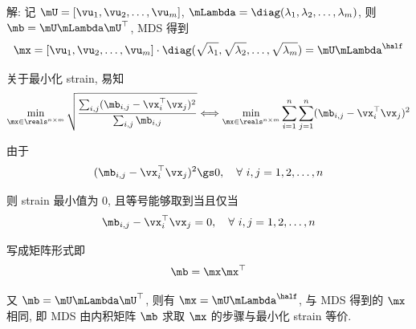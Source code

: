 \documentclass[openany]{ctexbook}
\theoremstyle{kaiti}
\theoremstyle{normal}
\begin{document}
解: 记 $\mU=[\vu_1, \vu_2, \dots, \vu_m]$, $\mLambda=\diag(\lambda_1, \lambda_2, \dots, \lambda_m)$, 则 $\mb=\mU\mLambda\mU^\top$,  MDS 得到
\begin{equation}
  \mx
  =[\vu_1, \vu_2, \dots, \vu_m]\cdot\diag(\sqrt{\lambda_1}, \sqrt{\lambda_2}, \dots, \sqrt{\lambda_m})
  =\mU\mLambda^{\half}
\end{equation}

关于最小化 strain, 易知
\begin{equation}
  \min_{\mx\in\reals^{n\times m}}\sqrt{\frac{\sum_{i,j}(\mb_{i,j} - \vx_i^\top\vx_j)^2}{\sum_{i,j}\mb_{i,j}}}
  \Longleftrightarrow
  \min_{\mx\in\reals^{n\times m}}\sum_{i=1}^n\sum_{j=1}^n(\mb_{i,j} - \vx_i^\top\vx_j)^2
\end{equation}

由于
\begin{equation}
  (\mb_{i,j} - \vx_i^\top\vx_j)^2\gs0,\quad\forall~i,j=1,2,\dots,n
\end{equation}

则 strain 最小值为 0, 且等号能够取到当且仅当
\begin{equation}
  \mb_{i,j} - \vx_i^\top\vx_j=0,\quad\forall~i,j=1,2,\dots,n
\end{equation}

写成矩阵形式即
\begin{equation}
  \mb=\mx\mx^\top
\end{equation}

又 $\mb=\mU\mLambda\mU^\top$, 则有 $\mx=\mU\mLambda^{\half}$, 与 MDS 得到的 $\mx$ 相同, 即 MDS 由内积矩阵 $\mb$ 求取 $\mx$ 的步骤与最小化 strain 等价.

\end{document}
